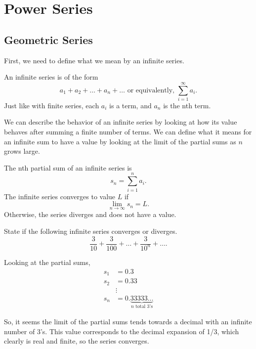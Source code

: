 \section{Power Series}
\subsection{Geometric Series}
First, we need to define what we mean by an infinite series.
\begin{definition}
	An infinite series is of the form
	\begin{equation*}
		a_1 + a_2 + \ldots + a_n + \ldots \text{ or equivalently, } \sum_{i=1}^{\infty}{a_i}.
	\end{equation*}
	Just like with finite series, each $a_i$ is a term, and $a_n$ is the nth term.
\end{definition}

We can describe the behavior of an infinite series by looking at how its value behaves after summing a finite number of terms.
We can define what it means for an infinite sum to have a value by looking at the limit of the partial sums as $n$ grows large.
\begin{definition}
	The nth partial sum of an infinite series is
	\begin{equation*}
		s_n = \sum_{i=1}^{n}{a_i}.
	\end{equation*}
	The infinite series converges to value $L$ if
	\begin{equation*}
		\lim_{n\to\infty}{s_n} = L.
	\end{equation*}
	Otherwise, the series diverges and does not have a value.
\end{definition}

\begin{example}
	State if the following infinite series converges or diverges.
	\begin{equation*}
		\frac{3}{10} + \frac{3}{100} + \ldots + \frac{3}{10^n} + \ldots.
	\end{equation*}
\end{example}
\begin{answer}
	Looking at the partial sums,
	\begin{align*}
		s_1 &= 0.3 \\
		s_2 &= 0.33 \\
		&\vdots \\
		s_n &= 0.\underbrace{33333\ldots}_{\text{$n$ total 3's}}
	\end{align*}
	
	So, it seems the limit of the partial sums tends towards a decimal with an infinite number of 3's.
	This value corresponds to the decimal expansion of 1/3, which clearly is real and finite, so the series converges.
\end{answer}


